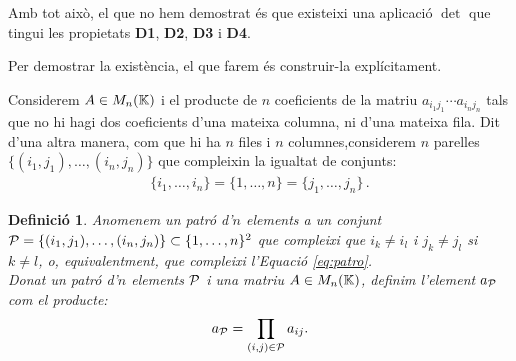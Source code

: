 \documentclass[
  11pt,
]{book}
\numberwithin{dummy}{section}
\theoremstyle{maincolornumbox}
\theoremstyle{blacknumex}
\theoremstyle{blacknumbox}
\newtheorem{definitionT}{Definició}[chapter]
\theoremstyle{maincolornum}
\newenvironment{definition}{\begin{dBox}\begin{definitionT}}{\end{definitionT}\end{dBox}}
\begin{document}
Amb tot això, el que no hem demostrat és que existeixi una aplicació
\(\det\) que tingui les propietats \textbf{D1}, \textbf{D2}, \textbf{D3} i \textbf{D4}.

Per demostrar la existència, el que farem és construir-la explícitament.

Considerem \(A\in M_n(\mathbb{K})\) i el producte de \(n\) coeficients de la matriu
\(a_{i_1j_1} \cdots a_{i_nj_n}\) tals que no hi hagi dos coeficients d'una
mateixa columna, ni d'una mateixa fila. Dit d'una altra manera, com que
hi ha \(n\) files i \(n\) columnes,considerem \(n\) parelles
\(\{(i_1,j_1),\dots,(i_n,j_n)\}\) que compleixin la igualtat de conjunts:
\begin{align*}
\label{eq:patro}
\{i_1, \dots, i_n\}=\{1, \dots, n\} = \{j_1, \dots, j_n\} \,.
\end{align*}

\begin{definition}
\protect\hypertarget{def:patro}{}\label{def:patro}Anomenem un \emph{patró} d'\(n\) elements a un
conjunt \(\mathcal{P}=\{(i_1,j_1),\dots,(i_n,j_n)\}\subset \{1,\dots,n\}^2\) que
compleixi que \(i_k\neq i_l\) i \(j_k\neq j_l\) si \(k\neq l\), o,
equivalentment, que compleixi l'Equació
\eqref{eq:patro}.\\
Donat un patró d'\(n\) elements \(\mathcal{P}\) i una matriu \(A\in M_n(\mathbb{K})\),
definim l'element \(a_{\mathcal{P}}\) com el producte:
\[a_{\mathcal{P}}=\prod_{(i,j)\in\mathcal{P}} a_{ij} .\]
\end{definition}
\end{document}

